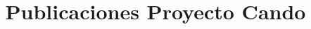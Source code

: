 \documentclass[a4paper]{article}
\begin{document}
\title{Publicaciones Proyecto Cando} 
\author{}
\date{}
\maketitle



\nocite{*}
\end{document}
